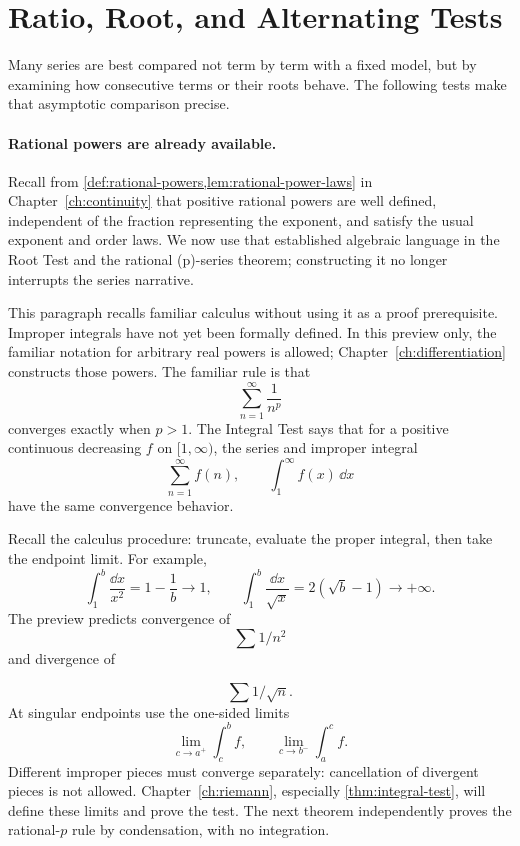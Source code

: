 \section{Ratio, Root, and Alternating Tests}

Many series are best compared not term by term with a fixed model, but by
examining how consecutive terms or their roots behave.  The following tests
make that asymptotic comparison precise.

\paragraph{Rational powers are already available.}
Recall from \cref{def:rational-powers,lem:rational-power-laws} in
Chapter~\ref{ch:continuity} that positive rational powers are well defined,
independent of the fraction representing the exponent, and satisfy the usual
exponent and order laws. We now use that established algebraic language in
the Root Test and the rational (p)-series theorem; constructing it no longer
interrupts the series narrative.

\begin{remark}
\label{rem:integral-test-preview}
This paragraph recalls familiar calculus without using it as a proof
prerequisite. Improper integrals have not yet been formally defined.
In this preview only, the familiar notation for arbitrary real powers
is allowed; Chapter~\ref{ch:differentiation} constructs those powers.
The familiar rule is that
\[
\sum_{n=1}^\infty\frac1{n^p}
\]
converges exactly when $p>1$. The Integral Test says that for a positive
continuous decreasing $f$ on $[1,\infty)$, the series and improper integral
\[
\sum_{n=1}^\infty f(n),
\qquad
\int_1^\infty f(x)\,\dd x
\]
have the same convergence behavior.

Recall the calculus procedure: truncate, evaluate the proper integral,
then take the endpoint limit. For example,
\[
\int_1^b\frac{\dd x}{x^2}=1-\frac1b\to1,\qquad
\int_1^b\frac{\dd x}{\sqrt{x}}=2(\sqrt b-1)\to+\infty.
\]
The preview predicts convergence of
\[
\sum1/n^2
\]
 and divergence of

\[
\sum1/\sqrt n.
\]
 At singular endpoints use the one-sided limits
\[
\lim_{c\to a^+}\int_c^b f,
\qquad
\lim_{c\to b^-}\int_a^c f.
\]
Different improper pieces must converge
separately: cancellation of divergent pieces is not allowed.
Chapter~\ref{ch:riemann}, especially \cref{thm:integral-test}, will
define these limits and prove the test. The next theorem independently
proves the rational-$p$ rule by condensation, with no integration.
\end{remark}

